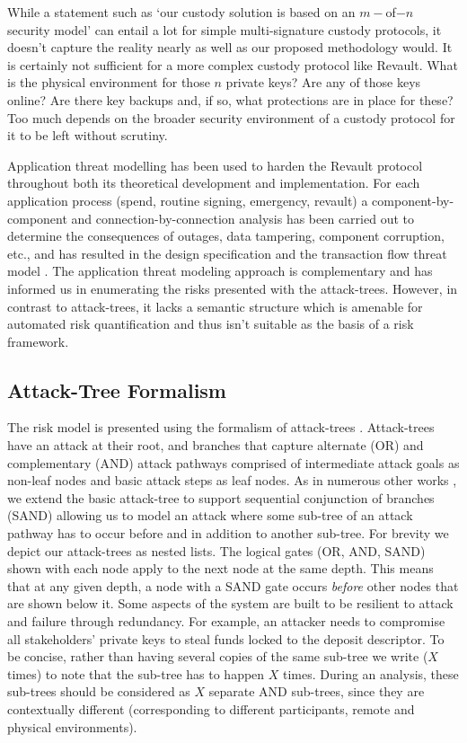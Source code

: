 \documentclass[runningheads]{llncs}
\begin{document}
While a statement such as `our custody solution is based on an $m-$of$-n$ security model' can entail a lot for simple multi-signature custody protocols, it doesn't capture the reality nearly as well as our proposed methodology would. It is certainly not sufficient for a more complex custody protocol like Revault. What is the physical environment for those $n$ private keys? Are any of those keys online? Are there key backups and, if so, what protections are in place for these? Too much depends on the broader security environment of a custody protocol for it to be left without scrutiny.   

Application threat modelling has been used to harden the Revault protocol throughout both its theoretical development and implementation. For each application process (spend, routine signing, emergency, revault) a component-by-component and connection-by-connection analysis has been carried out to determine the consequences of outages, data tampering, component corruption, etc., and has resulted in the design specification \cite{practical-revault} and the transaction flow threat model \cite{revault-pdf}. The application threat modeling approach is complementary and has informed us in enumerating the risks presented with the attack-trees. However, in contrast to attack-trees, it lacks a semantic structure which is amenable for automated risk quantification and thus isn't suitable as the basis of a risk framework. 


\subsection{Attack-Tree Formalism}
\label{sec:Attack-treeFormalism}

The risk model is presented using the formalism of attack-trees \cite{AttackTrees,ThreatLogicTrees,ThreatTrees}. Attack-trees have an attack at their root, and branches that capture alternate (OR) and complementary (AND) attack pathways comprised of intermediate attack goals as non-leaf nodes and basic attack steps as leaf nodes. As in numerous other works
\cite{ADTool2,DBLP:journals/corr/JhawarKMRT15,AFTrees,10.1093/cybsec/tyaa020,Duqu2,ADTreesSAND}, we extend the basic attack-tree to support  sequential conjunction of branches (SAND) allowing us to model an attack where some sub-tree of an attack pathway has to occur before and in addition to another sub-tree. For brevity we depict our attack-trees as nested lists. The logical gates (OR, AND, SAND) shown with each node apply to the next node at the same depth. This means that at any given depth, a node with a SAND gate occurs \textit{before} other nodes that are shown below it. Some aspects of the system are built to be resilient to attack and failure through redundancy. For example, an attacker needs to compromise all stakeholders' private keys to steal funds locked to the deposit descriptor. To be concise, rather than having several copies of the same sub-tree we write ($X$ times) to note that the sub-tree has to happen $X$ times. During an analysis, these sub-trees should be considered as $X$ separate AND sub-trees, since they are contextually different (corresponding to different participants, remote and physical environments).
\end{document}
